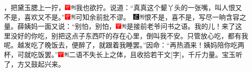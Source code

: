 ，把黛玉腮上一拧，{\includegraphics[width=3mm]{../Images/00002}\includegraphics[width=3mm]{../Images/00011}\footnotesize \kaishu 我也欲拧。}说道：“真真这个颦丫头的一张嘴，叫人恨又不是，喜欢又不是。”{{\includegraphics[width=3mm]{../Images/00002}\includegraphics[width=3mm]{../Images/00011}\footnotesize \kaishu 可知余前批不谬。　}\includegraphics[width=3mm]{../Images/00006}\includegraphics[width=3mm]{../Images/00011}\footnotesize \kaishu 恨不是，喜不是，写尽一晌含容之量。}薛姨妈一面又说：“别怕，别怕，{\includegraphics[width=3mm]{../Images/00002}\includegraphics[width=3mm]{../Images/00011}\footnotesize \kaishu 是接前老爷问书之语。}我的儿！来了这里没好的你吃，别把这点子东西吓的存在心里，倒叫我不安。只管放心吃，都有我呢。越发吃了晚饭去，便醉了，就跟着我睡罢。”因命：“再热酒来！姨妈陪你吃两杯，可就吃饭罢。”{\includegraphics[width=3mm]{../Images/00002}\includegraphics[width=3mm]{../Images/00011}\footnotesize \kaishu 二语不失长上之体，且收拾若干文{[}字{]}，千斤力量。}宝玉听了，方又鼓起兴来。

